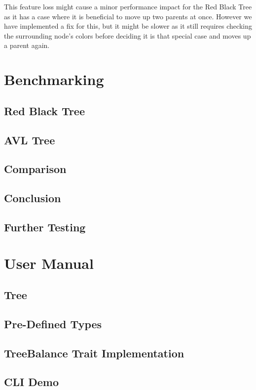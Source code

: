 \documentclass[12pt, letterpaper]{article}
\begin{document}
This feature loss might cause a minor performance impact for the Red Black Tree as it has a case where it is beneficial
to move up two parents at once.  However we have implemented a fix for this, but it might be slower as it still requires
checking the surrounding node's colors before deciding it is that special case and moves up a parent again.

\section{Benchmarking}

\subsection{Red Black Tree}

\subsection{AVL Tree}

\subsection{Comparison}

\subsection{Conclusion}

\subsection{Further Testing}

\section{User Manual}

\subsection{Tree}

\subsection{Pre-Defined Types}

\subsection{TreeBalance Trait Implementation}

\subsection{CLI Demo}
\end{document}
